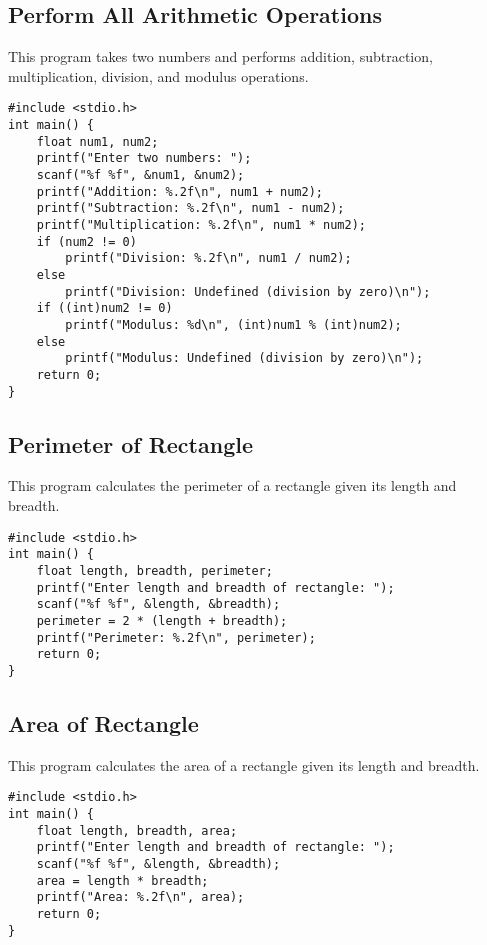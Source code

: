 \documentclass[a4paper,12pt]{article}
\begin{document}
\newpage

\subsection{Perform All Arithmetic Operations}
This program takes two numbers and performs addition, subtraction, multiplication, division, and modulus operations.

\begin{lstlisting}[caption={Perform All Arithmetic Operations}]
#include <stdio.h>
int main() {
    float num1, num2;
    printf("Enter two numbers: ");
    scanf("%f %f", &num1, &num2);
    printf("Addition: %.2f\n", num1 + num2);
    printf("Subtraction: %.2f\n", num1 - num2);
    printf("Multiplication: %.2f\n", num1 * num2);
    if (num2 != 0)
        printf("Division: %.2f\n", num1 / num2);
    else
        printf("Division: Undefined (division by zero)\n");
    if ((int)num2 != 0)
        printf("Modulus: %d\n", (int)num1 % (int)num2);
    else
        printf("Modulus: Undefined (division by zero)\n");
    return 0;
}
\end{lstlisting}

\newpage

\subsection{Perimeter of Rectangle}
This program calculates the perimeter of a rectangle given its length and breadth.

\begin{lstlisting}[caption={Perimeter of Rectangle}]
#include <stdio.h>
int main() {
    float length, breadth, perimeter;
    printf("Enter length and breadth of rectangle: ");
    scanf("%f %f", &length, &breadth);
    perimeter = 2 * (length + breadth);
    printf("Perimeter: %.2f\n", perimeter);
    return 0;
}
\end{lstlisting}

\newpage

\subsection{Area of Rectangle}
This program calculates the area of a rectangle given its length and breadth.

\begin{lstlisting}[caption={Area of Rectangle}]
#include <stdio.h>
int main() {
    float length, breadth, area;
    printf("Enter length and breadth of rectangle: ");
    scanf("%f %f", &length, &breadth);
    area = length * breadth;
    printf("Area: %.2f\n", area);
    return 0;
}
\end{lstlisting}
\end{document}
